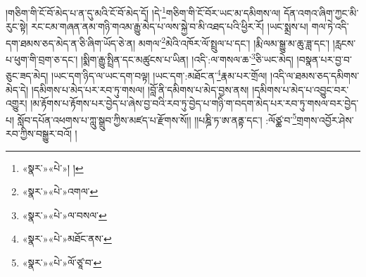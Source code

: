 །གཅིག་གི་ངོ་བོ་མེད་པ་ན་དུ་མའི་ངོ་བོ་མེད་དོ། །དེ་\footnote{«སྣར་»«པེ་»། །}གཅིག་གི་ངོ་བོར་ཡང་མ་དམིགས་ལ། དོན་འགའ་ཞིག་ཀྱང་མི་རུང་སྟེ། རང་ངམ་གཞན་ནམ་གཉི་གའམ་རྒྱུ་མེད་པ་ལས་སྐྱེ་བ་མི་འཐད་པའི་ཕྱིར་རོ། །ཡང་སྨྲས་པ། གལ་ཏེ་འདི་དག་ཐམས་ཅད་མེད་ན་ཅི་ཞིག་ཡོད་ཅེ་ན། མགལ་\footnote{«སྣར་»«པེ་»འགལ་}མེའི་འཁོར་ལོ་སྤྲུལ་པ་དང་། །རྨི་ལམ་སྒྱུ་མ་ཆུ་ཟླ་དང་། །རླངས་པ་ཕུག་གི་བྲག་ཅ་དང་། །སྨིག་རྒྱུ་སྤྲིན་དང་མཚུངས་པ་ཡིན། །འདི་:ལ་གསལ་ཆ་\footnote{«སྣར་»«པེ་»ལ་བསལ་}ཅི་ཡང་མེད། །བསྣན་པར་བྱ་བ་ཅུང་ཟད་མེད། །ཡང་དག་ཉིད་ལ་ཡང་དག་བལྟ། །ཡང་དག་:མཐོང་ན་\footnote{«སྣར་»«པེ་»མཐོང་ནས་}རྣམ་པར་གྲོལ། །འདི་ལ་ཐམས་ཅད་དམིགས་མེད་དེ། །དམིགས་པ་མེད་པར་རབ་ཏུ་གསལ། །བློ་ནི་དམིགས་པ་མེད་བྱས་ནས། །དམིགས་པ་མེད་པ་འབྱུང་བར་འགྱུར། །མ་རྟོགས་པ་རྟོགས་པར་བྱེད་པ་ཞེས་བྱ་བའི་རབ་ཏུ་བྱེད་པ་གཉི་ག་བདག་མེད་པར་རབ་ཏུ་གསལ་བར་བྱེད་པ། སློབ་དཔོན་འཕགས་པ་ཀླུ་སྒྲུབ་ཀྱིས་མཛད་པ་རྫོགས་སོ།། །།པཎྜི་ཏ་ཨ་ནནྟ་དང་། :ལོཙྪ་བ་\footnote{«སྣར་»«པེ་»ལོ་ཙཱ་བ་}གྲགས་འབྱོར་ཤེས་རབ་ཀྱིས་བསྒྱུར་བའོ། ། 
